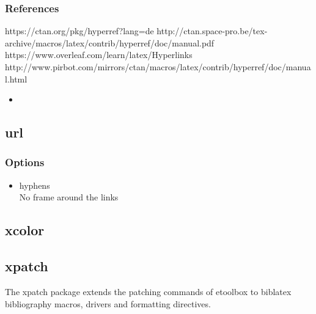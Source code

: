 \subsubsection{References}
https://ctan.org/pkg/hyperref?lang=de
http://ctan.space-pro.be/tex-archive/macros/latex/contrib/hyperref/doc/manual.pdf
https://www.overleaf.com/learn/latex/Hyperlinks
http://www.pirbot.com/mirrors/ctan/macros/latex/contrib/hyperref/doc/manual.html
\begin{itemize}
    \item{}
\end{itemize}

\subsection{url}
\subsubsection{Options}
\begin{itemize}
    \item{hyphens\\
        No frame around the links}
\end{itemize}
\subsection{xcolor}
\subsection{xpatch}
The xpatch package extends the patching commands of etoolbox to biblatex
bibliography macros, drivers and formatting directives.
